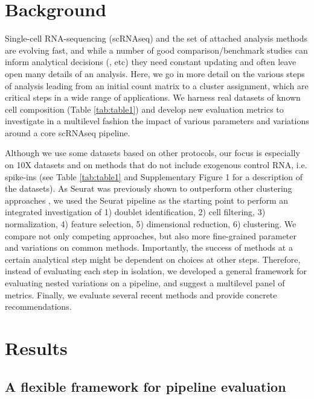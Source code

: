 \documentclass{bmcart}
\begin{document}

\section*{Background}

Single-cell RNA-sequencing (scRNAseq) and the set of attached analysis methods are evolving fast, and while a number of good comparison/benchmark studies can inform analytical decisions (\citealp{duoClustering2018}, etc) they need constant updating and often leave open many details of an analysis. Here, we go in more detail on the various steps of analysis leading from an initial count matrix to a cluster assignment, which are critical steps in a wide range of applications. We harness real datasets of known cell composition (Table \ref{tab:table1}) and develop new evaluation metrics to investigate in a multilevel fashion the impact of various parameters and variations around a core scRNAseq pipeline.

Although we use some datasets based on other protocols, our focus is especially on 10X datasets and on methods that do not include exogenous control RNA, i.e. spike-ins (see Table \ref{tab:table1} and Supplementary Figure 1 for a description of the datasets). As Seurat \cite{satijaSeurat2015} was previously shown to outperform other clustering approaches \cite{duoClustering2018,tianMixology2018}, we used the Seurat pipeline as the starting point to perform an integrated investigation of 1) doublet identification, 2) cell filtering, 3) normalization, 4) feature selection, 5) dimensional reduction, 6) clustering. We compare not only competing approaches, but also more fine-grained parameter and variations on common methods. Importantly, the success of methods at a certain analytical step might be dependent on choices at other steps. Therefore, instead of evaluating each step in isolation, we developed a general framework for evaluating nested variations on a pipeline, and suggest a multilevel panel of metrics. Finally, we evaluate several recent methods and provide concrete recommendations.

\section*{Results}

\subsection*{A flexible framework for pipeline evaluation}
\end{document}
